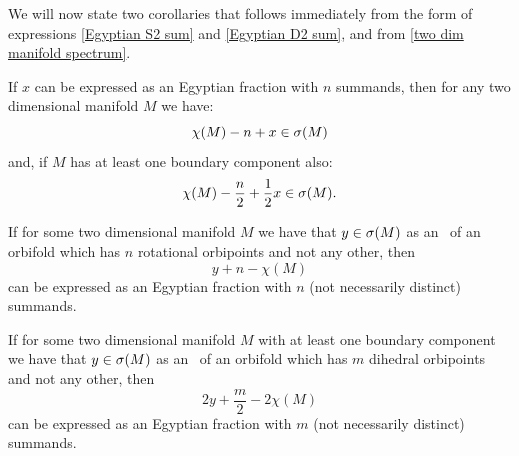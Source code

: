 %

We will now state two corollaries that follows immediately from the 
form of expressions \ref{Egyptian S2 sum} and \ref{Egyptian D2 sum}, and from 
\ref{two dim manifold spectrum}.
\begin{corollary}\label{from Egyptian fractions}
If $x$ can be expressed as an Egyptian fraction with $n$ summands, then for any two dimensional 
manifold $M$ we have: 
\begin{equation}
\chi(M) - n + x \in {{\sigma}(M)}
\end{equation}
and, if $M$ has at least one boundary component also:
\begin{equation}
\chi(M) - \frac{n}{2} + \frac{1}{2}x \in {{\sigma}(M)}.
\end{equation}
\end{corollary}
\begin{corollary}\label{to egyptian fractions}
If for some two dimensional manifold $M$ we have that $y \in {{\sigma}(M)}$ as an \Eoc\ of 
an orbifold which has $n$ rotational orbipoints and not any other, 
then 
\begin{equation}
y + n - \chi(M)
\end{equation} 
can be expressed as an Egyptian fraction with $n$ 
(not necessarily distinct) summands. 

If for some two dimensional manifold $M$ with at least one boundary component 
we have that $y \in {{\sigma}(M)}$ as an \Eoc\ of an orbifold which has $m$ dihedral orbipoints and 
not any other, 
then 
\begin{equation}
2y + \frac{m}{2} - 2\chi(M)
\end{equation}
can be expressed as an Egyptian fraction with $m$ 
(not necessarily distinct) summands. 
\end{corollary}

